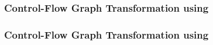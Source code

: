 \begin{frame}[t]
	\frametitle{Control-Flow Graph Transformation using \qvasr}
	\resizebox{\textwidth}{!}{}
\end{frame}

\begin{frame}[t]
	\frametitle{Control-Flow Graph Transformation using \qvasr}
	\begin{columns}[c]
		\begin{column}{0.4\textwidth}
			\vspace*{0.5cm}
			
		\end{column}
		\begin{column}{0.4\textwidth}
			\resizebox{\textwidth}{!}{}
		\end{column}
	\end{columns}
\end{frame}